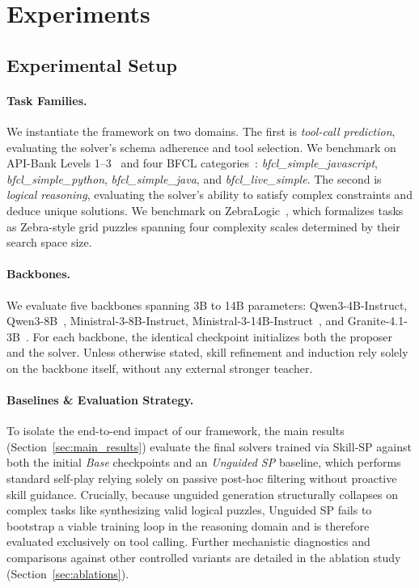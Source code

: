 \section{Experiments}
\label{sec:experiments}

\subsection{Experimental Setup}
\label{sec:experimental_setup}

\paragraph{Task Families.} 
We instantiate the framework on two domains. The first is \emph{tool-call prediction}, evaluating the solver's schema adherence and tool selection. We benchmark on API-Bank Levels 1--3~\citep{li2023api} and four BFCL categories~\citep{patil2025berkeley}: \textit{bfcl\_simple\_javascript}, \textit{bfcl\_simple\_python}, \textit{bfcl\_simple\_java}, and \textit{bfcl\_live\_simple}. The second is \emph{logical reasoning}, evaluating the solver's ability to satisfy complex constraints and deduce unique solutions. We benchmark on ZebraLogic~\citep{lin2025zebralogic}, which formalizes tasks as Zebra-style grid puzzles spanning four complexity scales determined by their search space size.

\paragraph{Backbones.}
We evaluate five backbones spanning 3B to 14B parameters: Qwen3-4B-Instruct, Qwen3-8B~\citep{yang2025qwen3}, Ministral-3-8B-Instruct, Ministral-3-14B-Instruct~\citep{liu2026ministral}, and Granite-4.1-3B~\citep{granite2026}. For each backbone, the identical checkpoint initializes both the proposer and the solver. Unless otherwise stated, skill refinement and induction rely solely on the backbone itself, without any external stronger teacher.

\paragraph{Baselines \& Evaluation Strategy.}
To isolate the end-to-end impact of our framework, the main results (Section~\ref{sec:main_results}) evaluate the final solvers trained via Skill-SP against both the initial \emph{Base} checkpoints and an \emph{Unguided SP} baseline, which performs standard self-play relying solely on passive post-hoc filtering without proactive skill guidance. Crucially, because unguided generation structurally collapses on complex tasks like synthesizing valid logical puzzles, Unguided SP fails to bootstrap a viable training loop in the reasoning domain and is therefore evaluated exclusively on tool calling. Further mechanistic diagnostics and comparisons against other controlled variants are detailed in the ablation study (Section~\ref{sec:ablations}).


